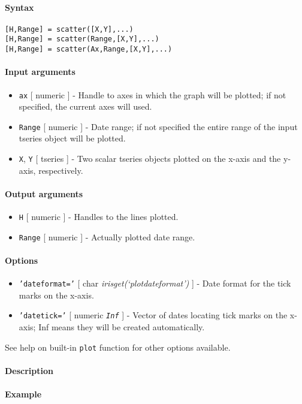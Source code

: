 


	\paragraph{Syntax}

\begin{verbatim}
[H,Range] = scatter([X,Y],...)
[H,Range] = scatter(Range,[X,Y],...)
[H,Range] = scatter(Ax,Range,[X,Y],...)
\end{verbatim}

\paragraph{Input arguments}

\begin{itemize}
\item
  \texttt{ax} {[} numeric {]} - Handle to axes in which the graph will
  be plotted; if not specified, the current axes will used.
\item
  \texttt{Range} {[} numeric {]} - Date range; if not specified the
  entire range of the input tseries object will be plotted.
\item
  \texttt{X}, \texttt{Y} {[} tseries {]} - Two scalar tseries objects
  plotted on the x-axis and the y-axis, respectively.
\end{itemize}

\paragraph{Output arguments}

\begin{itemize}
\item
  \texttt{H} {[} numeric {]} - Handles to the lines plotted.
\item
  \texttt{Range} {[} numeric {]} - Actually plotted date range.
\end{itemize}

\paragraph{Options}

\begin{itemize}
\item
  \texttt{'dateformat='} {[} char \textbar{}
  \emph{irisget(`plotdateformat')} {]} - Date format for the tick marks
  on the x-axis.
\item
  \texttt{'datetick='} {[} numeric \textbar{} \emph{\texttt{Inf}} {]} -
  Vector of dates locating tick marks on the x-axis; Inf means they will
  be created automatically.
\end{itemize}

See help on built-in \texttt{plot} function for other options available.

\paragraph{Description}

\paragraph{Example}


